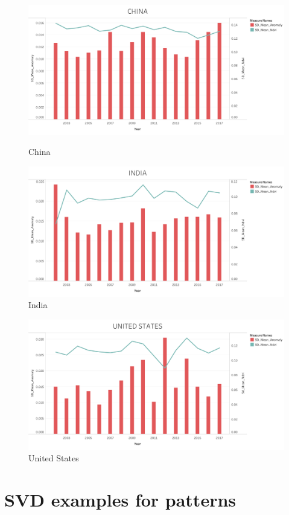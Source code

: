 \begin{itemize}
     \begin{figure}[!htb]
        \begin{minipage}{0.5\textwidth}
            \centering
            \includegraphics[width=1.0\linewidth]{figures/ch5/StandardDeviation/CHINA_SD.png}
            \caption{China}\label{Fig:CHINA_SD}
        \end{minipage}\hfill
        \begin{minipage}{0.5\textwidth}
            \centering
            \includegraphics[width=1.0\linewidth]{figures/ch5/StandardDeviation/INDIA_SD.png}
            \caption{India}\label{Fig:INDIA_SD}
        \end{minipage}
    \end{figure}
    
     \begin{figure}[H]
            \centering
            \includegraphics[width=0.5\linewidth]{figures/ch5/StandardDeviation/US_SD.png}
            \caption{\label{fig:US_SD} United States}
    \end{figure}
    
\end{itemize}

   

\section{SVD examples for patterns}


